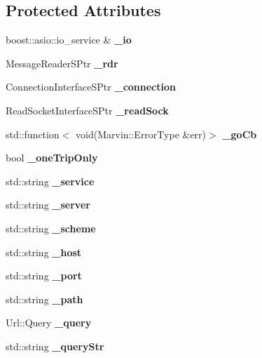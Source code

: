 \subsection*{Protected Attributes}
\begin{DoxyCompactItemize}
\item 
\mbox{\label{class_request_a281495472bc533384d273ad2e9c747b7}} 
boost\+::asio\+::io\+\_\+service \& {\bfseries \+\_\+io}
\item 
\mbox{\label{class_request_a384fc425224362988597830b21d9a48e}} 
Message\+Reader\+S\+Ptr {\bfseries \+\_\+rdr}
\item 
\mbox{\label{class_request_a1fc82297ae22708d0c405c422c66807f}} 
Connection\+Interface\+S\+Ptr {\bfseries \+\_\+connection}
\item 
\mbox{\label{class_request_aa9852adbf9fba98ba7bdecb6e8d5a30e}} 
Read\+Socket\+Interface\+S\+Ptr {\bfseries \+\_\+read\+Sock}
\item 
\mbox{\label{class_request_a1a605eca637460576d0f56d3c8c7b936}} 
std\+::function$<$ void(Marvin\+::\+Error\+Type \&err)$>$ {\bfseries \+\_\+go\+Cb}
\item 
\mbox{\label{class_request_ae6cf259304098272c26655851aa482cd}} 
bool {\bfseries \+\_\+one\+Trip\+Only}
\item 
\mbox{\label{class_request_a6e689919d384805d52ebfd2f8fec71db}} 
std\+::string {\bfseries \+\_\+service}
\item 
\mbox{\label{class_request_acaef6cea153579e81bad5bd5da7922f8}} 
std\+::string {\bfseries \+\_\+server}
\item 
\mbox{\label{class_request_a967d7538ddd207dfb720881f2258566a}} 
std\+::string {\bfseries \+\_\+scheme}
\item 
\mbox{\label{class_request_ad2eaec63a9e7259713435c6c07f2f2a1}} 
std\+::string {\bfseries \+\_\+host}
\item 
\mbox{\label{class_request_a921b319801626a6de3efcd7105449c2b}} 
std\+::string {\bfseries \+\_\+port}
\item 
\mbox{\label{class_request_a0cbbe7e1f72e983934815780bffd679a}} 
std\+::string {\bfseries \+\_\+path}
\item 
\mbox{\label{class_request_ac087de88773edb3045709a5a5a480fa0}} 
Url\+::\+Query {\bfseries \+\_\+query}
\item 
\mbox{\label{class_request_ad5911146df93fe3b6ea57b0ca5280880}} 
std\+::string {\bfseries \+\_\+query\+Str}
\end{DoxyCompactItemize}
